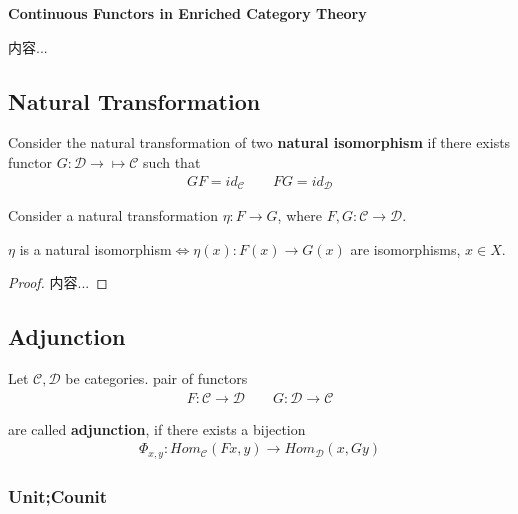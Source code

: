 \documentclass[Total.tex]{subfiles}
\begin{document}
					\textbf{Continuous Functors in Enriched Category Theory}
					\begin{Def}
						内容...
					\end{Def}
				\subsection{Natural Transformation}
			\begin{Def}
				Consider the natural transformation of two  \textbf{natural isomorphism} if there exists functor $G:\mathcal{D}\rightarrow \mapsto\mathcal{C}$ such that
				\begin{gather*}
					GF=id_\mathcal{C}\qquad FG=id_\mathcal{D}
				\end{gather*}
			\end{Def}
			
			\begin{lemma}
				Consider a natural transformation $\eta:F\rightarrow G$, where $F,G:\mathcal{C}\rightarrow \mathcal{D}$. 
				
				$\eta$ is a natural isomorphism$\Leftrightarrow \eta(x):F(x)\rightarrow G(x)$ are isomorphisms, $x\in X$. 
			\end{lemma}
			\begin{proof}
				内容...
			\end{proof}
			\subsection{Adjunction}
			\begin{Def}
				Let $\mathcal{C},\mathcal{D}$ be categories. pair of functors 
				\begin{gather*}
					F:\mathcal{C}\rightarrow \mathcal{D}\qquad G:\mathcal{D}\rightarrow \mathcal{C}
				\end{gather*}
				
				are called \textbf{adjunction}, if there exists a bijection
				\begin{gather*}
					\Phi_{x,y}:Hom_\mathcal{C}(Fx,y)\rightarrow Hom_\mathcal{D}(x,Gy) 
				\end{gather*}
			\end{Def}
			
			\subsubsection{Unit;Counit}
			
\end{document}
